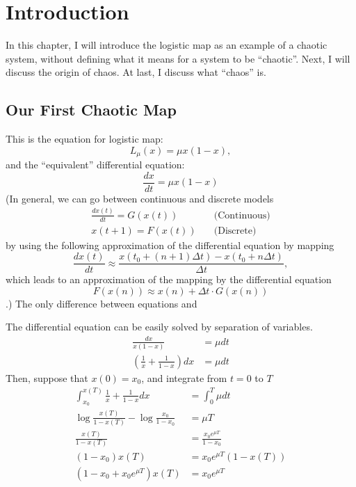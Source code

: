 \documentclass[12pt,twoside]{book}
\begin{document}
\chapter{Introduction}
In this chapter, I will introduce the logistic map as an example of a chaotic system, without defining what it means for a system to be ``chaotic''.
Next, I will discuss the origin of chaos.
At last, I discuss what ``chaos'' is.

\section{Our First Chaotic Map}

This is the equation for logistic map:
\begin{equation}
  L_{\mu}(x) = \mu x(1-x),
  \label{logistic}
\end{equation}
and the ``equivalent'' differential equation:
\begin{equation}
  \frac{dx}{dt} = \mu x(1-x)
  \label{logisticdiffeq}
\end{equation}
(In general, we can go between continuous and discrete models
\begin{align*}
  \frac{dx(t)}{dt} = G(x(t)) &\quad\mbox{(Continuous)} \\
  x(t + 1) = F(x(t)) &\quad\mbox{(Discrete)}
\end{align*}
by using the following approximation of the differential equation by mapping
\begin{equation*}
  \frac{dx(t)}{dt} \approx \frac{x(t_0 + (n+1)\Delta t) - x(t_0 + n \Delta t)}{\Delta t},
\end{equation*}
which leads to an approximation of the mapping by the differential equation
\begin{equation*}
  F(x(n)) \approx x(n) + \Delta t \cdot G(x(n))
\end{equation*}
.)
The only difference between equations  and 

The differential equation  can be easily solved by separation of variables.
\begin{align*}
  \frac{dx}{x(1-x)} &= \mu dt \\  
  \left( \frac{1}{x} + \frac{1}{1-x} \right) dx &= \mu dt
\end{align*}
Then, suppose that $x(0) = x_0$, and integrate from $t = 0$ to $T$
\begin{align*}
  \int_{x_0}^{x(T)} \frac{1}{x} + \frac{1}{1-x} dx &= \int_0^T \mu dt \\
  \log{\frac{x(T)}{1-x(T)}} - \log{\frac{x_0}{1-x_0}} &= \mu T \\
  \frac{x(T)}{1-x(T)} &= \frac{x_0 e^{\mu T}}{1-x_0} \\
  (1-x_0)x(T) &= x_0 e^{\mu T} (1-x(T)) \\
  (1-x_0 + x_0 e^{\mu T})x(T) &= x_0 e^{\mu T}
\end{align*}
\end{document}
